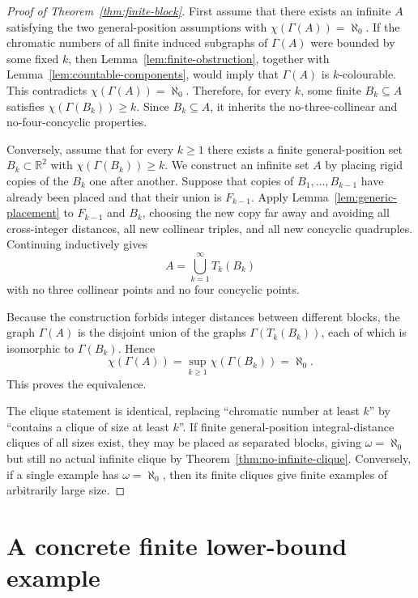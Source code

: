 \documentclass[11pt,a4paper]{amsart}
\theoremstyle{definition}
\newcommand{\R}{\mathbb{R}}
\begin{document}
\begin{proof}[Proof of Theorem~\ref{thm:finite-block}]
First assume that there exists an infinite $A$ satisfying the two general-position assumptions with $\chi(\Gamma(A))=\aleph_0$.  If the chromatic numbers of all finite induced subgraphs of $\Gamma(A)$ were bounded by some fixed $k$, then Lemma~\ref{lem:finite-obstruction}, together with Lemma~\ref{lem:countable-components}, would imply that $\Gamma(A)$ is $k$-colourable.  This contradicts $\chi(\Gamma(A))=\aleph_0$.  Therefore, for every $k$, some finite $B_k\subseteq A$ satisfies $\chi(\Gamma(B_k))\geq k$.  Since $B_k\subseteq A$, it inherits the no-three-collinear and no-four-concyclic properties.

Conversely, assume that for every $k\geq 1$ there exists a finite general-position set $B_k\subset\R^2$ with $\chi(\Gamma(B_k))\geq k$.  We construct an infinite set $A$ by placing rigid copies of the $B_k$ one after another.  Suppose that copies of $B_1,\ldots,B_{k-1}$ have already been placed and that their union is $F_{k-1}$.  Apply Lemma~\ref{lem:generic-placement} to $F_{k-1}$ and $B_k$, choosing the new copy far away and avoiding all cross-integer distances, all new collinear triples, and all new concyclic quadruples.  Continuing inductively gives
\[
        A=\bigcup_{k=1}^{\infty} T_k(B_k)
\]
with no three collinear points and no four concyclic points.

Because the construction forbids integer distances between different blocks, the graph $\Gamma(A)$ is the disjoint union of the graphs $\Gamma(T_k(B_k))$, each of which is isomorphic to $\Gamma(B_k)$.  Hence
\[
        \chi(\Gamma(A))=\sup_{k\geq 1}\chi(\Gamma(B_k))=\aleph_0.
\]
This proves the equivalence.

The clique statement is identical, replacing ``chromatic number at least $k$'' by ``contains a clique of size at least $k$''.  If finite general-position integral-distance cliques of all sizes exist, they may be placed as separated blocks, giving $\omega=\aleph_0$ but still no actual infinite clique by Theorem~\ref{thm:no-infinite-clique}.  Conversely, if a single example has $\omega=\aleph_0$, then its finite cliques give finite examples of arbitrarily large size.
\end{proof}

\section{A concrete finite lower-bound example}
\end{document}
